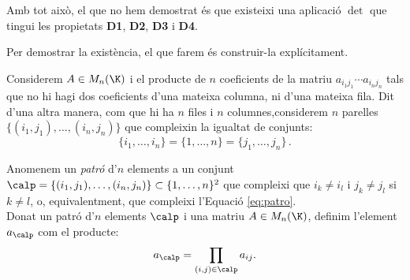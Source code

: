 Amb tot això, el que no hem demostrat és que existeixi una aplicació $\det$ que tingui les propietats \textbf{D1}, \textbf{D2}, \textbf{D3} i \textbf{D4}.

Per demostrar la existència, el que farem és construir-la explícitament. 

Considerem $A\in M_n(\K)$ i el producte de $n$ coeficients de la matriu $a_{i_1j_1} \cdots a_{i_nj_n}$ tals que no hi hagi dos coeficients d'una mateixa columna, ni d'una mateixa fila. Dit d'una altra manera, com que hi ha $n$ files i $n$ columnes,considerem $n$ parelles $\{(i_1,j_1),\dots,(i_n,j_n)\}$ que compleixin la igualtat de conjunts:
\begin{equation}\label{eq:patro}
\{i_1, \dots, i_n\}=\{1, \dots, n\} = \{j_1, \dots, j_n\} \,.
\end{equation}
\begin{definicio}\label{def:patro}
Anomenem un \emph{patró} d'$n$ elements a un conjunt $\calp=\{(i_1,j_1),\dots,(i_n,j_n)\}\subset \{1,\dots,n\}^2$ que compleixi que $i_k\neq i_l$ i $j_k\neq j_l$ si $k\neq l$, o, equivalentment, que compleixi l'Equació \eqref{eq:patro}.\\
Donat un patró d'$n$ elements $\calp$ i una matriu $A\in M_n(\K)$, definim l'element $a_\calp$ com el producte:
$$
a_\calp=\prod_{(i,j)\in\calp} a_{ij} .
$$
\end{definicio}
